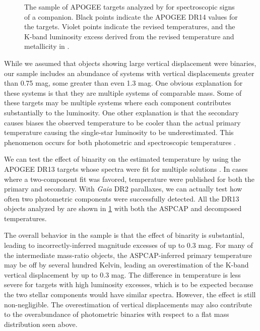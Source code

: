 \documentclass[manuscript]{aastex6}
\newcommand{\Gaia}{\mbox{\textit{Gaia}}}
\begin{document}
\begin{figure}[htb]
    \centering
    \caption{The sample of APOGEE targets analyzed by \citet{ElBadry18b} for
    spectroscopic signs of a companion. Black points indicate the APOGEE DR14 
values for the targets. Violet points indicate the revised temperatures, and the
K-band luminosity excess derived from the revised temperature and metallicity
in \citet{ElBadry18b}.}
    \label{fig:elbadry_excess}
\end{figure}

While we assumed that objects showing large vertical displacement were
binaries, our sample includes an abundance of systems with vertical
displacements greater than 0.75 mag, some greater than even 1.3 mag. One
obvious explanation for these systems is that they are multiple systems of
comparable mass. Some of these targets may be multiple systems where each
component contributes substantially to the luminosity. One other explanation is 
that the secondary causes biases the observed temperature to be cooler than the 
actual primary temperature causing the single-star luminosity to be 
underestimated. This phenomenon occurs for both photometric and spectroscopic 
temperatures \citep{Pinsonneault12,ElBadry18a}. 

We can test the effect of binarity on the estimated temperature by using the
APOGEE DR13 targets whose spectra were fit for multiple solutions
\citep{ElBadry18b}. In cases where a two-component fit was favored, temperature
were published for both the primary and secondary. With \Gaia{} DR2 parallaxes,
we can actually test how often two photometric components were successfully
detected. All the DR13 objects analyzed by \citet{ElBadry18b} are shown in
\cref{fig:elbadry_excess} with both the ASPCAP and decomposed temperatures.

The overall behavior in the \citet{ElBadry18b} sample is that the effect of 
binarity is substantial, leading to incorrectly-inferred magnitude excesses of
up to 0.3 mag. For many of the intermediate mass-ratio objects, the 
ASPCAP-inferred primary temperature may be off by several hundred Kelvin, 
leading an overestimation of the K-band vertical displacement by up to 0.3 
mag. The difference in temperature is less severe for targets with high 
luminosity excesses, which is to be expected because the two stellar 
components would have similar spectra. However, the effect is still 
non-negligible. The overestimation of vertical displacements may also contribute 
to the overabundance of photometric binaries with respect to a flat mass 
distribution seen above. 
\end{document}
